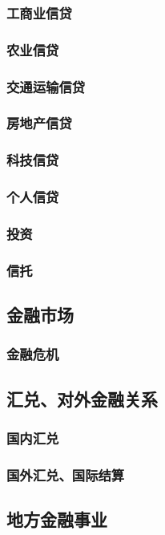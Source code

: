 \documentclass[UTF8]{../../RepresentationUniverse}
\begin{document}
    \subsubsection{工商业信贷}
    \subsubsection{农业信贷}
    \subsubsection{交通运输信贷}
    \subsubsection{房地产信贷}
    \subsubsection{科技信贷}
    \subsubsection{个人信贷}
    \subsubsection{投资}
    \subsubsection{信托}
\subsection{金融市场}
    \subsubsection{金融危机}
\subsection{汇兑、对外金融关系}
    \subsubsection{国内汇兑}
    \subsubsection{国外汇兑、国际结算}
\subsection{地方金融事业}
\end{document}
